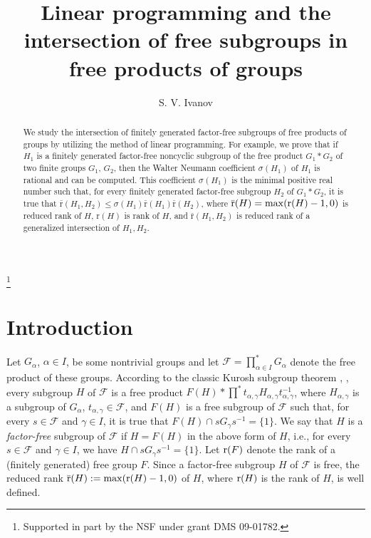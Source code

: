\documentclass[10pt, reqno]{amsart}
\numberwithin{equation}{section}
\begin{document}
\title
[Linear programming and intersection of subgroups in free products]
{Linear programming and the intersection of free subgroups in free products of groups}
\author{S. V. Ivanov }
 \address{  Department of Mathematics\\
 University of Illinois \\
 Urbana\\  IL 61801\\ U.S.A. } 
\thanks{Supported in part by  the NSF under  grant  DMS 09-01782.}

\begin{abstract}
We study the intersection of finitely generated factor-free subgroups of free products of  groups by utilizing the method of linear programming.  For example, we prove that if $H_1$ is a finitely generated
factor-free noncyclic subgroup of the free product $G_1 * G_2$   of two finite groups $G_1$, $G_2$, then the Walter Neumann  coefficient $\sigma(H_1)$ of $H_1$ is rational and can be computed. This coefficient $\sigma(H_1)$ is the minimal positive real number such that, for every  finitely generated
factor-free subgroup $H_2$ of  $G_1 * G_2$, it is true that
$\bar {\mathrm{r}}(H_1, H_2)  \le  \sigma(H_1) \bar {\mathrm{r}}(H_1) \bar {\mathrm{r}}(H_2)$, where $\bar{ {\rm r}} (H) = \max ( {\rm r} (H)-1,0)$ is reduced rank of $H$, ${\mathrm{r}} (H)$ is rank of $H$, and  $\bar {\mathrm{r}}(H_1, H_2)$ is reduced rank of a generalized intersection of $H_1, H_2$.
\end{abstract}
\maketitle

\section{Introduction}

Let $G_{\alpha}$, ${\alpha} \in I$, be some nontrivial groups and let
 ${\mathcal{F}} = \prod_{\alpha \in I}^* G_\alpha$ denote the free product of these groups. According to the classic Kurosh subgroup
theorem  \cite{K}, \cite{LS}, every subgroup $H$ of ${\mathcal{F}}$ is a free product $ F(H) * \prod^*  t_{{{\alpha},\gamma}} H_{{\alpha},\gamma} t_{{{\alpha},\gamma}}^{-1}$, where $H_{{{\alpha},\gamma}}$ is a subgroup of $G_{\alpha}$, $t_{{{\alpha},\gamma}} \in
{\mathcal{F}}$, and $F(H)$ is a free subgroup of
${\mathcal{F}}$  such that, for every $s \in {\mathcal{F}}$
and $\gamma \in I$,  it is true that $F(H) \cap
s G_\gamma s^{-1} =\{ 1 \}$. We say that $H$
is a {\em factor-free} subgroup of  ${\mathcal{F}}$  if $H=F(H)$ in the above form of $H$, i.e., for every $s \in
{\mathcal{F}}$ and $\gamma \in I$, we have $H \cap s
G_\gamma s^{-1} =\{ 1 \}$. Let ${\rm r} (F)$ denote the rank of a (finitely generated)
 free group $F$.   Since a factor-free subgroup $H$ of
${\mathcal{F}}$  is free,  the  reduced
rank $\bar{ {\rm r}} (H) := \max ( {\rm r} (H)-1,0)$ of $H$, where ${\rm r} (H)$ is the rank of $H$,  is well defined.
\end{document}
